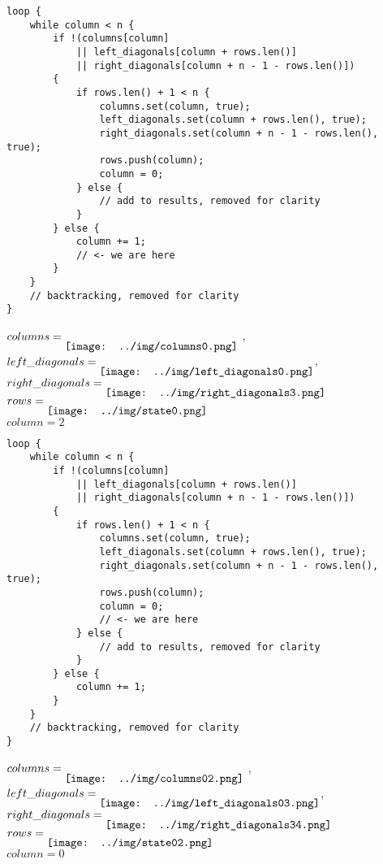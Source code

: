 \begin{frame}[fragile]
    \begin{verbatim}
loop {
    while column < n {
        if !(columns[column]
            || left_diagonals[column + rows.len()]
            || right_diagonals[column + n - 1 - rows.len()])
        {
            if rows.len() + 1 < n {
                columns.set(column, true);
                left_diagonals.set(column + rows.len(), true);
                right_diagonals.set(column + n - 1 - rows.len(), true);
                rows.push(column);
                column = 0;
            } else {
                // add to results, removed for clarity
            }
        } else {
            column += 1;
            // <- we are here
        }
    }
    // backtracking, removed for clarity
}
    \end{verbatim}
    $columns = \raisebox{-2ex}{\texttt{[image: ../img/columns0.png]}}$ ,
    $left\_diagonals = \raisebox{-2ex}{\texttt{[image: ../img/left\_diagonals0.png]}}$,
    $right\_diagonals = \raisebox{-2ex}{\texttt{[image: ../img/right\_diagonals3.png]}}$ \\
    $rows = \raisebox{-2ex}{\texttt{[image: ../img/state0.png]}}$ \\
    $column = 2$
\end{frame}
\begin{frame}[fragile]
    \begin{verbatim}
loop {
    while column < n {
        if !(columns[column]
            || left_diagonals[column + rows.len()]
            || right_diagonals[column + n - 1 - rows.len()])
        {
            if rows.len() + 1 < n {
                columns.set(column, true);
                left_diagonals.set(column + rows.len(), true);
                right_diagonals.set(column + n - 1 - rows.len(), true);
                rows.push(column);
                column = 0;
                // <- we are here
            } else {
                // add to results, removed for clarity
            }
        } else {
            column += 1; 
        }
    }
    // backtracking, removed for clarity
}
    \end{verbatim}
    $columns = \raisebox{-2ex}{\texttt{[image: ../img/columns02.png]}}$ ,
    $left\_diagonals = \raisebox{-2ex}{\texttt{[image: ../img/left\_diagonals03.png]}}$,
    $right\_diagonals = \raisebox{-2ex}{\texttt{[image: ../img/right\_diagonals34.png]}}$ \\
    $rows = \raisebox{-2ex}{\texttt{[image: ../img/state02.png]}}$ \\
    $column = 0$
\end{frame}
